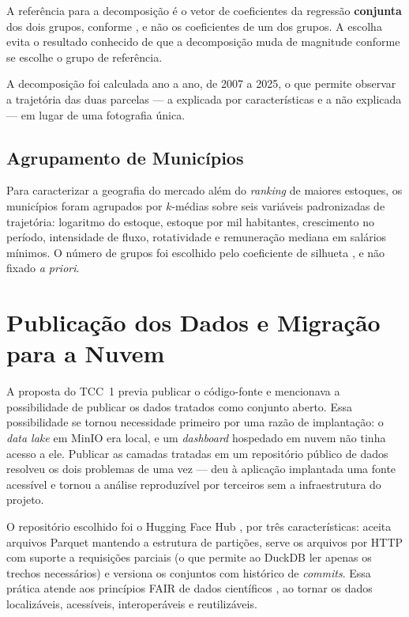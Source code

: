 A referência para a decomposição é o vetor de coeficientes da regressão \textbf{conjunta} dos dois grupos, conforme , e não os coeficientes de um dos grupos. A escolha evita o resultado conhecido de que a decomposição muda de magnitude conforme se escolhe o grupo de referência.

A decomposição foi calculada ano a ano, de 2007 a 2025, o que permite observar a trajetória das duas parcelas --- a explicada por características e a não explicada --- em lugar de uma fotografia única.

\subsection{Agrupamento de Municípios}
\label{subsec:metodo-clusters}

Para caracterizar a geografia do mercado além do \textit{ranking} de maiores estoques, os municípios foram agrupados por $k$-médias \cite{MacQueen1967} sobre seis variáveis padronizadas de trajetória: logaritmo do estoque, estoque por mil habitantes, crescimento no período, intensidade de fluxo, rotatividade e remuneração mediana em salários mínimos. O número de grupos foi escolhido pelo coeficiente de silhueta \cite{Rousseeuw1987}, e não fixado \textit{a priori}.

\section{Publicação dos Dados e Migração para a Nuvem}
\label{sec:publicacao}

A proposta do TCC~1 previa publicar o código-fonte e mencionava a possibilidade de publicar os dados tratados como conjunto aberto. Essa possibilidade se tornou necessidade primeiro por uma razão de implantação: o \textit{data lake} em MinIO era local, e um \textit{dashboard} hospedado em nuvem não tinha acesso a ele. Publicar as camadas tratadas em um repositório público de dados resolveu os dois problemas de uma vez --- deu à aplicação implantada uma fonte acessível e tornou a análise reproduzível por terceiros sem a infraestrutura do projeto.

O repositório escolhido foi o Hugging Face Hub \cite{HuggingFaceDatasets2026}, por três características: aceita arquivos Parquet mantendo a estrutura de partições, serve os arquivos por HTTP com suporte a requisições parciais (o que permite ao DuckDB ler apenas os trechos necessários) e versiona os conjuntos com histórico de \textit{commits}. Essa prática atende aos princípios FAIR de dados científicos \cite{WilkinsonFair2016}, ao tornar os dados localizáveis, acessíveis, interoperáveis e reutilizáveis.

